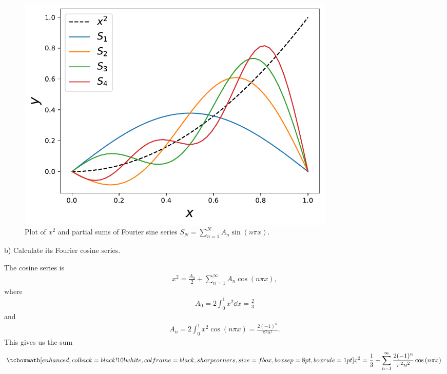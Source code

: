 \begin{figure}[H]
\begin{center}
    \includegraphics[width=0.75\textwidth]{./prob5_1_2a.pdf}
\end{center} 
\caption{
Plot of $x^2$ and partial sums of Fourier sine series $S_{N} = \sum_{n=1}^{N} A_{n}\sin{(n\pi x)}$.
}
\label{fig:partial-sums-sine-series}
\end{figure}

b) Calculate its Fourier cosine series.

The cosine series is
\begin{eqnarray}
    \label{eq:cosine-series}
    x^2 = \frac{A_0}{2} + \sum_{n=1}^{\infty} A_{n}\cos{(n\pi x)}
,\end{eqnarray}
where
\begin{eqnarray}
    \label{eq:A0-cosine}
    A_{0} = 2 \int_{0}^{1} x^2 \dd{x} = \frac{2}{3}
\end{eqnarray}
and
\begin{eqnarray}
    \label{eq:An-cosine}
    A_{n} = 2 \int_{0}^{1} x^2 \cos{(n\pi x)} = \frac{2(-1)^{n}}{\pi^2n^2}
.\end{eqnarray}
This gives us the sum
\begin{align}
    \label{eq:x2-cosine-series}
    \eqbox{
    x^2 = \frac{1}{3} + \sum_{n=1}^{\infty} \frac{2(-1)^{n}}{\pi^2 n^2} \cos{(n \pi x)}
}
.\end{align}

